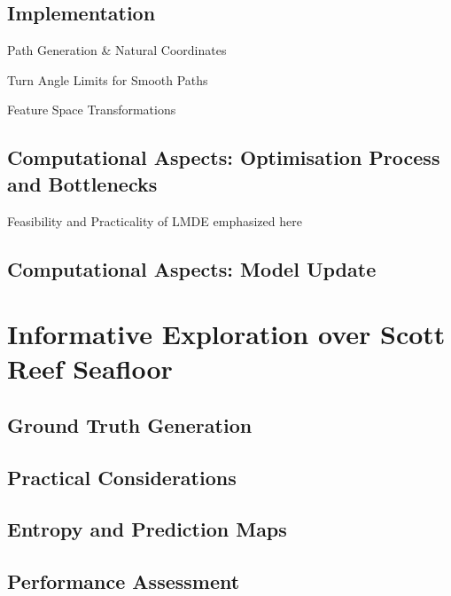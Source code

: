 		\subsection{Implementation}

			Path Generation \& Natural Coordinates
			
			Turn Angle Limits for Smooth Paths
			
			Feature Space Transformations
			
		\subsection{Computational Aspects: Optimisation Process and Bottlenecks}
		
		Feasibility and Practicality of LMDE emphasized here
		
		\subsection{Computational Aspects: Model Update}
	
%	
%	
	
	\section{Informative Exploration over Scott Reef Seafloor}
	\label{Informative-Seafloor-Exploration:Informative-Exploration-over-Scott-Reef-Seafloor}
	
		\subsection{Ground Truth Generation}
		
		\subsection{Practical Considerations}
		
		\subsection{Entropy and Prediction Maps}
		
		\subsection{Performance Assessment}
	
	
	